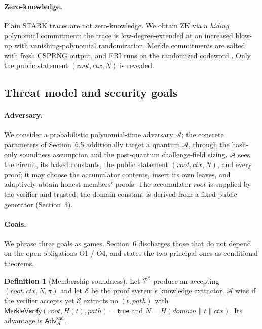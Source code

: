 \documentclass[11pt]{article}
\newcommand{\cat}{\mathbin{\|}}          %
\newcommand{\Adv}{\mathsf{Adv}}
\theoremstyle{plain}
\theoremstyle{definition}
\newtheorem{definition}{Definition}
\begin{document}
\paragraph{Zero-knowledge.} Plain STARK traces are not zero-knowledge. We obtain ZK via a \emph{hiding}
polynomial commitment: the trace is low-degree-extended at an increased blow-up with
vanishing-polynomial randomization, Merkle commitments are salted with fresh CSPRNG output, and FRI
runs on the randomized codeword \cite{Hab22,BCRSVW19}. Only the public statement
$(\mathit{root}, \mathit{ctx}, N)$ is revealed.

\subsection*{Threat model and security goals}

\paragraph{Adversary.} We consider a probabilistic polynomial-time adversary $\mathcal{A}$; the
concrete parameters of Section~6.5 additionally target a quantum $\mathcal{A}$, through the hash-only
soundness assumption and the post-quantum challenge-field sizing. $\mathcal{A}$ sees the circuit, its
baked constants, the public statement $(\mathit{root}, \mathit{ctx}, N)$, and every proof; it may
choose the accumulator contents, insert its own leaves, and adaptively obtain honest members' proofs.
The accumulator $\mathit{root}$ is supplied by the verifier and trusted; the domain constant is
derived from a fixed public generator (Section~3).

\paragraph{Goals.} We phrase three goals as games. Section~6 discharges those that do not depend on
the open obligations O1 / O4, and states the two principal ones as conditional theorems.

\begin{definition}[Membership soundness]
Let $\mathcal{P}^\ast$ produce an accepting $(\mathit{root}, \mathit{ctx}, N, \pi)$ and let
$\mathcal{E}$ be the proof system's knowledge extractor. $\mathcal{A}$ wins if the verifier accepts
yet $\mathcal{E}$ extracts no $(t, \mathit{path})$ with
$\textsf{MerkleVerify}(\mathit{root}, H(t), \mathit{path}) = \textsf{true}$ and
$N = H(\mathit{domain} \cat t \cat \mathit{ctx})$. Its advantage is $\Adv^{\mathrm{snd}}_{\mathcal{A}}$.
\end{definition}
\end{document}
